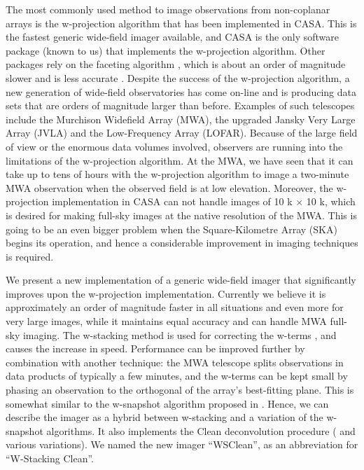 \documentclass[a4paper,10pt]{article}
\begin{document}
The most commonly used method to image observations from non-coplanar arrays is the w-projection algorithm \citep{wprojection-cornwell} that has been implemented in CASA. This is the fastest generic wide-field imager available, and CASA is the only software package (known to us) that implements the w-projection algorithm. Other packages rely on the faceting algorithm \citep{facetting-cornwell}, which is about an order of magnitude slower and is less accurate \citep{wprojection-cornwell}. Despite the success of the w-projection algorithm, a new generation of wide-field observatories has come on-line and is producing data sets that are orders of magnitude larger than before. Examples of such telescopes include the Murchison Widefield Array (MWA), the upgraded Jansky Very Large Array (JVLA) and the Low-Frequency Array (LOFAR). Because of the large field of view or the enormous data volumes involved, observers are running into the limitations of the w-projection algorithm. At the MWA, we have seen that it can take up to tens of hours with the w-projection algorithm to image a two-minute MWA observation when the observed field is at low elevation. Moreover, the w-projection implementation in CASA can not handle images of 10 k $\times$ 10 k, which is desired for making full-sky images at the native resolution of the MWA. This is going to be an even bigger problem when the Square-Kilometre Array (SKA) begins its operation, and hence a considerable improvement in imaging techniques is required.

We present a new implementation of a generic wide-field imager that significantly improves upon the w-projection implementation. Currently we believe it is approximately an order of magnitude faster in all situations and even more for very large images, while it maintains equal accuracy and can handle MWA full-sky imaging. The w-stacking method is used for correcting the w-terms \citep{widefield-imaging-ska-cornwell}, and causes the increase in speed. Performance can be improved further by combination with another technique: the MWA telescope splits observations in data products of typically a few minutes, and the w-terms can be kept small by phasing an observation to the orthogonal of the array's best-fitting plane. This is somewhat similar to the w-snapshot algorithm proposed in \citet{widefield-imaging-ska-cornwell}. Hence, we can describe the imager as a hybrid between w-stacking and a variation of the w-snapshot algorithms. It also implements the Clean deconvolution procedure (\citealt{hogbom-clean} and various variations). We named the new imager ``WSClean'', as an abbreviation for ``W-Stacking Clean''.
\end{document}
